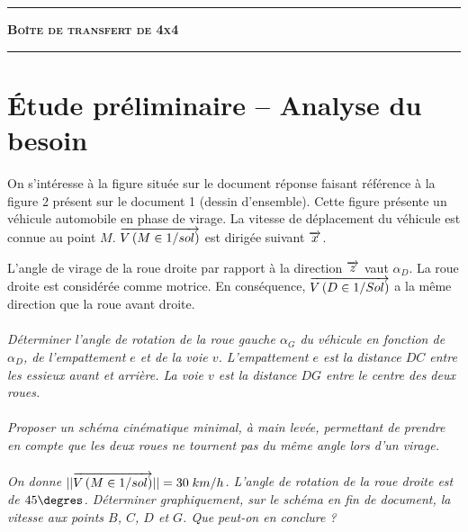 \documentclass[11pt,oneside]{article}
\begin{document}
\vspace{0.5cm}




\noindent\rule{\linewidth}{.2pt}
\begin{center}
 \LARGE\textbf{\textsc{Boîte de transfert de 4x4}}
\end{center}
\noindent\rule{\linewidth}{.2pt}



\section{Étude préliminaire -- Analyse du besoin}

On s'intéresse à la figure située sur le document réponse faisant référence à la figure 2 présent sur le document 1 (dessin d'ensemble). Cette figure présente un véhicule automobile en phase de virage. La vitesse de déplacement du véhicule est connue au point $M$. $\overrightarrow{V\left( {M} \in {1}/{sol}\right)}$ est dirigée suivant $\overrightarrow{x}$.

L'angle de virage de la roue droite par rapport à la direction $\overrightarrow{z}$ vaut $\alpha_D$. La roue droite est considérée comme motrice. En conséquence, $\overrightarrow{V\left( {D} \in {1}/{Sol}\right)}$ a la même direction que la roue avant droite. 

\paragraph{}
\textit{Déterminer l'angle de rotation de la roue gauche $\alpha_G$ du véhicule en fonction de $\alpha_D$, de l'empattement $e$ et de la voie $v$. L'empattement $e$ est la distance $DC$ entre les essieux avant et arrière. La voie $v$ est la distance $DG$ entre le centre des deux roues.}



\paragraph{}
\textit{Proposer un schéma cinématique minimal, à main levée, permettant de prendre en compte que les deux roues ne tournent pas du même angle lors d'un virage. }


\paragraph{}
\textit{On donne $||\overrightarrow{V\left( {M} \in {1}/{sol}\right)}||=30\; km/h$. L'angle de rotation de la roue droite est de $45\degres$. Déterminer graphiquement, sur le schéma en fin de document, la vitesse aux points $B$, $C$, $D$ et $G$. Que peut-on en conclure ?}
\end{document}
